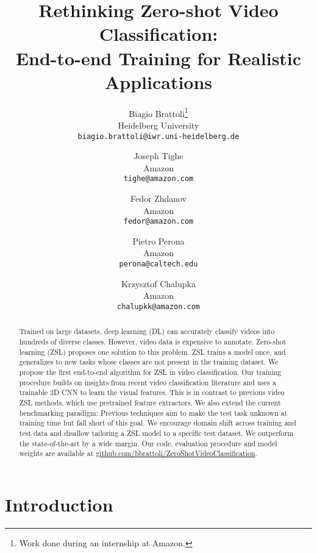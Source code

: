 \documentclass[10pt,twocolumn,letterpaper]{article}
\begin{document}
\title{Rethinking Zero-shot Video Classification: \\End-to-end Training for Realistic Applications}

\author{
Biagio Brattoli\thanks{Work done during an internship at Amazon.}\\
Heidelberg University\\
{\tt\small biagio.brattoli@iwr.uni-heidelberg.de}
\and
Joseph Tighe\\
Amazon\\
{\tt\small tighe@amazon.com}
\and
Fedor Zhdanov\\
Amazon\\
{\tt\small fedor@amazon.com}
\and
Pietro Perona\\
Amazon\\
{\tt\small perona@caltech.edu}
\and
Krzysztof Chalupka\\
Amazon\\
{\tt\small chalupkk@amazon.com}
}

\maketitle

\begin{abstract}
Trained on large datasets, deep learning (DL) can accurately classify videos into hundreds of diverse classes. However, video data is expensive to annotate. Zero-shot learning (ZSL) proposes one solution to this problem. ZSL trains a model once, and generalizes to new tasks whose classes are not present in the training dataset. We propose the first end-to-end algorithm for ZSL in video classification. Our training procedure builds on insights from recent video classification literature and uses a trainable 3D CNN to learn the visual features. This is in contrast to previous video ZSL methods, which use pretrained feature extractors. We also extend the current benchmarking paradigm: Previous techniques aim to make the test task unknown at training time but fall short of this goal. We encourage domain shift across training and test data and disallow tailoring a ZSL model to a specific test dataset. We outperform the state-of-the-art by a wide margin. Our code, evaluation procedure and model weights are available at 
\textcolor{blue}{\href{https://github.com/bbrattoli/ZeroShotVideoClassification}{github.com/bbrattoli/ZeroShotVideoClassification}}.
\end{abstract}

\section{Introduction}\label{sec:intro}
\end{document}
